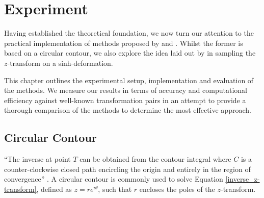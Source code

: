 \documentclass[a4paper]{report}
\begin{document}
\chapter{Experiment}
Having established the theoretical foundation, we now turn our attention to the practical implementation of methods proposed by \citet{AbateWhitt1992a, AbateWhitt1992b} and \citet{Cavers1978FFT}. Whilst the former is based on a circular contour, we also explore the idea laid out by \citet{levendorskii2022sinh} in sampling the $z$-transform on a sinh-deformation.

This chapter outlines the experimental setup, implementation and evaluation of the methods. We measure our results in terms of accuracy and computational efficiency against well-known transformation pairs in an attempt to provide a thorough comparison of the methods to determine the most effective approach.

\section{Circular Contour}
``The inverse at point $T$ can be obtained from the contour integral where $C$ is a counter-clockwise closed path encircling the origin and entirely in the region of convergence'' \citep{horvath2020numerical}. A circular contour is commonly used to solve Equation \ref{inverse_z-transform}, defined as $z = re^{i\theta}$, such that $r$ encloses the poles of the $z$-transform. 
\end{document}
